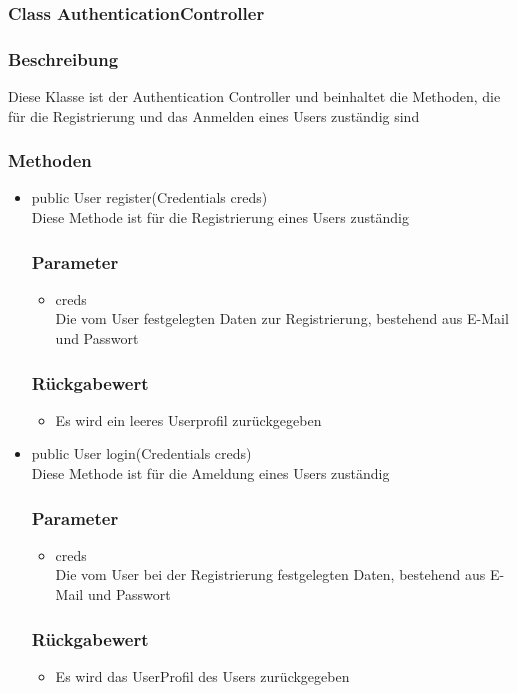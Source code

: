 \documentclass[a4paper]{scrreprt}
\begin{document}
\subsubsection{Class AuthenticationController}
\subsubsection*{Beschreibung}
Diese Klasse ist der Authentication Controller und beinhaltet die Methoden, die für die Registrierung und das Anmelden eines Users zuständig sind

\subsubsection*{Methoden}
\begin{addmargin}[25pt]{0pt}
\begin{itemize}

\item public User register(Credentials creds)\\
	Diese Methode ist für die Registrierung eines Users zuständig
	\subsubsection*{Parameter}
	\begin{itemize}
	\item creds \\
		Die vom User festgelegten Daten zur Registrierung, bestehend aus E-Mail und Passwort
	\end{itemize}
	\subsubsection*{Rückgabewert}
	\begin{itemize}
	\item Es wird ein leeres Userprofil zurückgegeben
	\end{itemize}
	
\item public User login(Credentials creds)\\
	Diese Methode ist für die Ameldung eines Users zuständig
	\subsubsection*{Parameter}
	\begin{itemize}
	\item creds \\
		Die vom User bei der Registrierung festgelegten Daten, bestehend aus E-Mail und Passwort
	\end{itemize}
	\subsubsection*{Rückgabewert}
	\begin{itemize}
	\item Es wird das UserProfil des Users zurückgegeben
	\end{itemize}

\end{itemize}
\end{addmargin}
\end{document}
